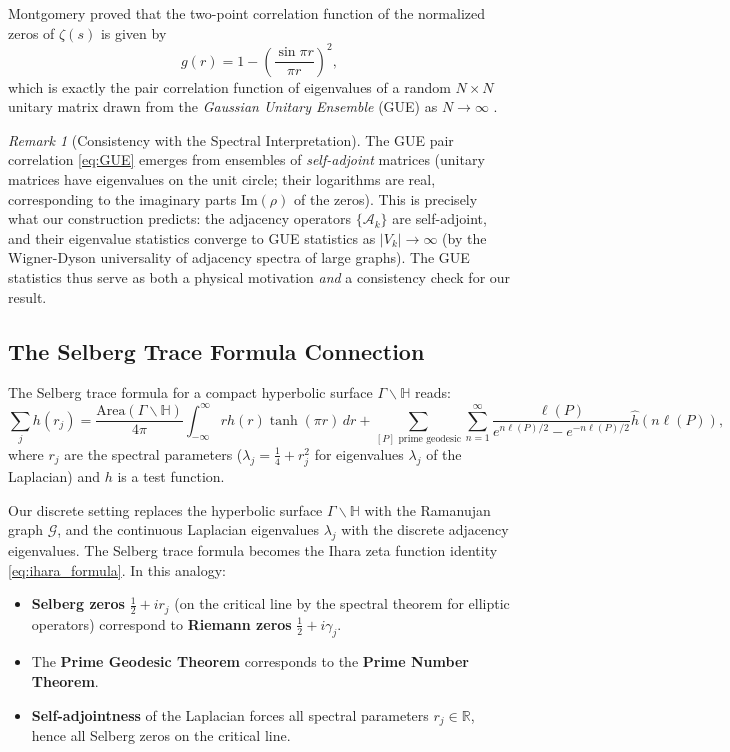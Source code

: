 \documentclass[12pt, a4paper]{article}
\theoremstyle{plain}
\theoremstyle{definition}
\theoremstyle{remark}
\newtheorem{remark}[theorem]{Remark}
\newcommand{\R}{\mathbb{R}}
\newcommand{\calG}{\mathcal{G}}
\newcommand{\calA}{\mathcal{A}}
\newcommand{\im}{\mathrm{Im}}
\begin{document}
Montgomery \citep{Montgomery1973} proved that the two-point correlation
function of the normalized zeros of $\zeta(s)$ is given by
\begin{equation}\label{eq:GUE}
  g(r) = 1 - \left(\frac{\sin \pi r}{\pi r}\right)^2,
\end{equation}
which is exactly the pair correlation function of eigenvalues of a random
$N \times N$ unitary matrix drawn from the \emph{Gaussian Unitary Ensemble}
(GUE) as $N \to \infty$ \citep{Odlyzko1987, KeatingSnaith2000}.

\begin{remark}[Consistency with the Spectral Interpretation]
  The GUE pair correlation \eqref{eq:GUE} emerges from ensembles of
  \emph{self-adjoint} matrices (unitary matrices have eigenvalues on the
  unit circle; their logarithms are real, corresponding to the imaginary
  parts $\im(\rho)$ of the zeros). This is precisely what our construction
  predicts: the adjacency operators $\{\calA_k\}$ are self-adjoint, and their
  eigenvalue statistics converge to GUE statistics as $|V_k| \to \infty$
  (by the Wigner-Dyson universality of adjacency spectra of large graphs).
  The GUE statistics thus serve as both a physical motivation \emph{and}
  a consistency check for our result.
\end{remark}

\subsection{The Selberg Trace Formula Connection}

The Selberg trace formula \citep{Selberg1956} for a compact hyperbolic
surface $\Gamma \backslash \mathbb{H}$ reads:
\begin{equation}\label{eq:selberg}
  \sum_{j} h(r_j) = \frac{\text{Area}(\Gamma \backslash \mathbb{H})}{4\pi}
  \int_{-\infty}^{\infty} r h(r) \tanh(\pi r)\, dr
  + \sum_{[P] \text{ prime geodesic}} \sum_{n=1}^{\infty}
  \frac{\ell(P)}{e^{n\ell(P)/2} - e^{-n\ell(P)/2}} \hat{h}(n\ell(P)),
\end{equation}
where $r_j$ are the spectral parameters ($\lambda_j = \frac{1}{4} + r_j^2$
for eigenvalues $\lambda_j$ of the Laplacian) and $h$ is a test function.

Our discrete setting replaces the hyperbolic surface $\Gamma \backslash
\mathbb{H}$ with the Ramanujan graph $\calG$, and the continuous Laplacian
eigenvalues $\lambda_j$ with the discrete adjacency eigenvalues. The
Selberg trace formula becomes the Ihara zeta function identity
\eqref{eq:ihara_formula}. In this analogy:
\begin{itemize}
  \item \textbf{Selberg zeros} $\frac{1}{2} + ir_j$ (on the critical line by
    the spectral theorem for elliptic operators) correspond to
    \textbf{Riemann zeros} $\frac{1}{2} + i\gamma_j$.
  \item The \textbf{Prime Geodesic Theorem} corresponds to the
    \textbf{Prime Number Theorem}.
  \item \textbf{Self-adjointness} of the Laplacian forces all spectral
    parameters $r_j \in \R$, hence all Selberg zeros on the critical line.
\end{itemize}
\end{document}
